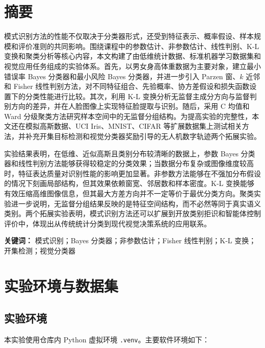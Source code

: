 \documentclass[UTF8,a4paper,12pt]{ctexart}
\begin{document}
\section*{摘\quad 要}
模式识别方法的性能不仅取决于分类器形式，还受到特征表示、概率假设、样本规模和评价准则的共同影响。围绕课程中的参数估计、非参数估计、线性判别、K-L 变换和聚类分析等核心内容，本文构建了由低维统计数据、标准机器学习数据集和视觉应用任务组成的实验体系。首先，以男女身高体重数据为主要对象，建立最小错误率 Bayes 分类器和最小风险 Bayes 分类器，并进一步引入 Parzen 窗、$k$ 近邻和 Fisher 线性判别方法，对不同特征组合、先验概率、协方差假设和损失函数设置下的分类性能进行比较。其次，利用 K-L 变换分析无监督主成分方向与监督判别方向的差异，并在人脸图像上实现特征脸提取与识别。随后，采用 C 均值和 Ward 分级聚类方法研究样本空间中的无监督分组结构。为提高实验的完整性，本文还在模拟高斯数据、UCI Iris、MNIST、CIFAR 等扩展数据集上测试相关方法，并补充开集目标检测和视觉分类器奖励引导的无人机数字轨迹两个拓展实验。

实验结果表明，在低维、近似高斯且类别分布较清晰的数据上，参数 Bayes 分类器和线性判别方法能够获得较稳定的分类效果；当数据分布复杂或图像维度较高时，特征表达质量对识别性能的影响更加显著。非参数方法能够在不强加分布假设的情况下刻画局部结构，但其效果依赖窗宽、邻居数和样本密度。K-L 变换能够有效压缩高维图像信息，但其最大方差方向并不一定等价于最优分类方向。聚类实验进一步说明，无监督分组结果反映的是特征空间结构，而不必然等同于真实语义类别。两个拓展实验表明，模式识别方法还可以扩展到开放类别拒识和智能体控制评价中，体现出从传统统计分类到现代视觉决策系统的应用联系。

\vspace{1em}
\noindent\textbf{关键词：} 模式识别；Bayes 分类器；非参数估计；Fisher 线性判别；K-L 变换；开集检测；视觉分类器

\clearpage
\tableofcontents
\clearpage
{}
{}
\listoffigures
\clearpage
{}
{}
\listoftables
\clearpage
{}

\section{实验环境与数据集}

\subsection{实验环境}

本实验使用仓库内 Python 虚拟环境 \texttt{.venv}。主要软件环境如下：
\end{document}

